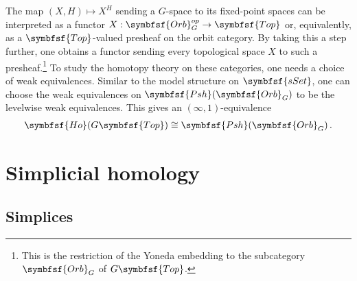    \begin{theorem}[Elmendorf]
        The map $(X,H)\mapsto X^H$ sending a $G$-space to its fixed-point spaces can be interpreted as a functor $X:\symbfsf{Orb}_G^{op}\rightarrow\symbfsf{Top}$ or, equivalently, as a $\symbfsf{Top}$-valued presheaf on the orbit category. By taking this a step further, one obtains a functor sending every topological space $X$ to such a presheaf.\footnote{This is the restriction of the Yoneda embedding to the subcategory $\symbfsf{Orb}_G$ of $G\symbfsf{Top}$.} To study the homotopy theory on these categories, one needs a choice of weak equivalences. Similar to the model structure on $\symbfsf{sSet}$, one can choose the weak equivalences on $\symbfsf{Psh}(\symbfsf{Orb}_G)$ to be the levelwise weak equivalences. This gives an $(\infty,1)$-equivalence
        \begin{gather}
            \symbfsf{Ho}(G\symbfsf{Top})\cong\symbfsf{Psh}(\symbfsf{Orb}_G)\,.
        \end{gather}
    \end{theorem}

\section{Simplicial homology}\label{section:homology}
\subsection{Simplices}

